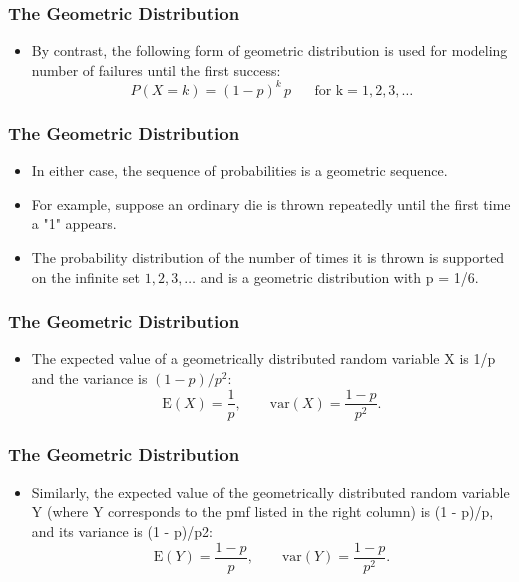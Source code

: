 \documentclass{beamer}
\begin{document}
\begin{frame}
\frametitle{The Geometric Distribution}
\Large
\begin{itemize}
\item

By contrast, the following form of geometric distribution is used for modeling number of failures until the first success:
\[ P(X=k) = (1 - p)^k\,p\, \phantom{spa} \mbox{for k} = 1, 2, 3, \ldots \]

\end{itemize}
\end{frame}
\begin{frame}
\frametitle{The Geometric Distribution}
\Large
\vspace{-1cm}
\begin{itemize}
\item
In either case, the sequence of probabilities is a geometric sequence.

\item For example, suppose an ordinary die is thrown repeatedly until the first time a "1" appears. 
\item The probability distribution of the number of times it is thrown is supported on the infinite set ${ 1, 2, 3, \ldots }$ and is a geometric distribution with p = 1/6.
\end{itemize}
\end{frame}
\begin{frame}
\frametitle{The Geometric Distribution}
\Large
\begin{itemize}
\item

The expected value of a geometrically distributed random variable X is 1/p and the variance is $(1 - p)/p^2$:
\[ \mathrm{E}(X) = \frac{1}{p}, \qquad\mathrm{var}(X) = \frac{1-p}{p^2}. \]
\end{itemize}
\end{frame}
\begin{frame}
\frametitle{The Geometric Distribution}
\Large
\vspace{-1cm}
\begin{itemize}
\item Similarly, the expected value of the geometrically distributed random variable Y (where Y corresponds to the pmf listed in the right column) is (1 - p)/p, 
and its variance is (1 - p)/p2:
\[ \mathrm{E}(Y) = \frac{1-p}{p}, \qquad\mathrm{var}(Y) = \frac{1-p}{p^2}.\]

\end{itemize}
\end{frame}
\end{document}
